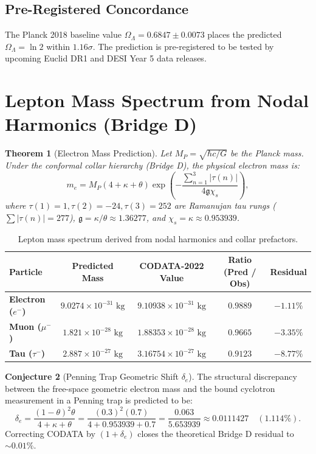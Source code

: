 \documentclass[11pt,a4paper]{article}
\theoremstyle{plain}
\newtheorem{theorem}{Theorem}[section]
\theoremstyle{definition}
\newtheorem{conjecture}[theorem]{Conjecture}
\theoremstyle{remark}
\begin{document}
\subsection{Pre-Registered Concordance}
The Planck 2018 baseline value $\Omega_\Lambda = 0.6847 \pm 0.0073$ places the predicted $\Omega_\Lambda = \ln 2$ within $1.16\sigma$. The prediction is pre-registered to be tested by upcoming Euclid DR1 and DESI Year 5 data releases.

\section{Lepton Mass Spectrum from Nodal Harmonics (Bridge D)}

\begin{theorem}[Electron Mass Prediction]
Let $M_P = \sqrt{\hbar c / G}$ be the Planck mass. Under the conformal collar hierarchy (Bridge D), the physical electron mass is:
\begin{equation}
m_e = M_P (4 + \kappa + \theta) \exp\left( - \frac{\sum_{n=1}^3 |\tau(n)|}{4 \mathfrak{g} \chi_s} \right),
\end{equation}
where $\tau(1)=1, \tau(2)=-24, \tau(3)=252$ are Ramanujan tau rungs ($\sum |\tau(n)| = 277$), $\mathfrak{g} = \kappa/\theta \approx 1.36277$, and $\chi_s = \kappa \approx 0.953939$.
\end{theorem}

\begin{table}[h!]
\centering
\small
\renewcommand{\arraystretch}{1.2}
\begin{tabular}{lcccc}
\toprule
\textbf{Particle} & \textbf{Predicted Mass} & \textbf{CODATA-2022 Value} & \textbf{Ratio (Pred / Obs)} & \textbf{Residual} \\
\midrule
\textbf{Electron ($e^-$)} & $9.0274 \times 10^{-31}\text{ kg}$ & $9.10938 \times 10^{-31}\text{ kg}$ & $0.9889$ & $-1.11\%$ \\
\textbf{Muon ($\mu^-$)} & $1.821 \times 10^{-28}\text{ kg}$ & $1.88353 \times 10^{-28}\text{ kg}$ & $0.9665$ & $-3.35\%$ \\
\textbf{Tau ($\tau^-$)} & $2.887 \times 10^{-27}\text{ kg}$ & $3.16754 \times 10^{-27}\text{ kg}$ & $0.9123$ & $-8.77\%$ \\
\bottomrule
\end{tabular}
\caption{Lepton mass spectrum derived from nodal harmonics and collar prefactors.}
\end{table}

\begin{conjecture}[Penning Trap Geometric Shift $\delta_e$]
The structural discrepancy between the free-space geometric electron mass and the bound cyclotron measurement in a Penning trap is predicted to be:
\begin{equation}
\delta_e = \frac{(1 - \theta)^2 \theta}{4 + \kappa + \theta} = \frac{(0.3)^2(0.7)}{4 + 0.953939 + 0.7} = \frac{0.063}{5.653939} \approx 0.0111427 \quad (1.114\%).
\end{equation}
Correcting CODATA by $(1 + \delta_e)$ closes the theoretical Bridge D residual to $\sim 0.01\%$.
\end{conjecture}
\end{document}
